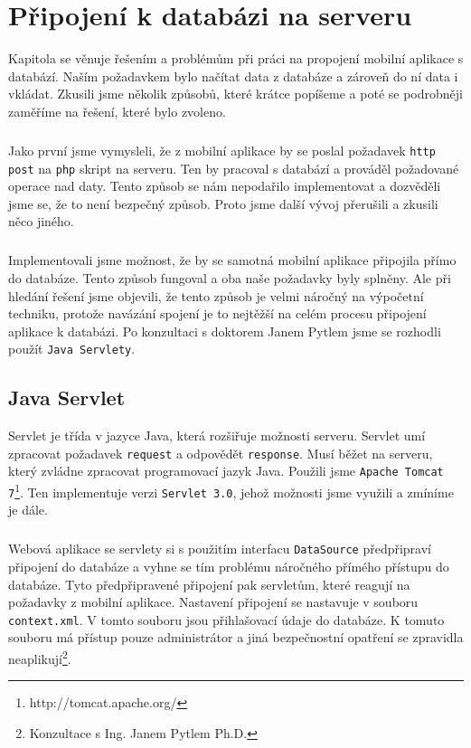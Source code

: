 \chapter{Připojení k databázi na serveru}
Kapitola se věnuje řešením a problémům při práci na propojení mobilní aplikace s databází. Naším požadavkem bylo načítat data z databáze a zároveň do ní data i vkládat. Zkusili jsme několik způsobů, které krátce popíšeme a poté se podrobněji zaměříme na řešení, které bylo zvoleno.

\paragraph{}
Jako první jsme vymysleli, že z mobilní aplikace by se poslal požadavek \texttt{http post} na \texttt{php} skript na serveru. Ten by pracoval s databází a prováděl požadované operace nad daty. Tento způsob se nám nepodařilo implementovat a dozvěděli jsme se, že to není bezpečný způsob. Proto jsme další vývoj přerušili a zkusili něco jiného.

\paragraph{}
Implementovali jsme možnost, že by se samotná mobilní aplikace připojila přímo do databáze. Tento způsob fungoval a oba naše požadavky byly splněny. Ale při hledání řešení jsme objevili, že tento způsob je velmi náročný na výpočetní techniku, protože navázání spojení je to nejtěžší na celém procesu připojení aplikace k databázi. Po konzultaci s doktorem Janem Pytlem jsme se rozhodli použít \texttt{Java Servlety}.

\section{Java Servlet}
Servlet je třída v jazyce Java, která rozšiřuje možnosti serveru. Servlet umí zpracovat požadavek \texttt{request} a odpovědět \texttt{response}. Musí běžet na serveru, který zvládne zpracovat programovací jazyk Java. Použili jsme \texttt{Apache Tomcat 7}\footnote{http://tomcat.apache.org/}. Ten implementuje verzi \texttt{Servlet 3.0}, jehož možnosti jsme využili a zmíníme je dále.
\paragraph{}
Webová aplikace se servlety si s použitím interfacu \texttt{DataSource} předpřipraví připojení do databáze a vyhne se tím problému náročného přímého přístupu do databáze. Tyto předpřipravené připojení pak  servletům, které reagují na požadavky z mobilní aplikace. Nastavení připojení se nastavuje v souboru \texttt{context.xml}. V tomto souboru jsou přihlašovací údaje do databáze. K tomuto souboru má přístup pouze administrátor a jiná bezpečnostní opatření se zpravidla neaplikují\footnote{Konzultace s Ing. Janem Pytlem Ph.D.}.


